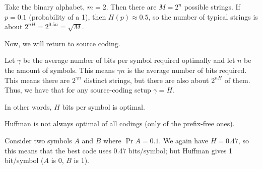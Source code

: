 \begin{example}
    Take the binary alphabet, $m = 2$. Then there are $M = 2^n$ possible strings. If $p = 0.1$ (probability of a 1), then $H(p) \approx 0.5$,
    so the number of typical strings is about $2^{nH} = 2^{0.5n} = \sqrt{M}$.
\end{example}

Now, we will return to source coding.

\begin{theorem}
    Let $\gamma$ be the average number of bits per symbol required optimally and let $n$ be the amount of symbols. This means $\gamma n$ is the average number of bits required.
    This means there are $2^{\gamma n}$ distinct strings, but there are also about $2^{nH}$ of them. Thus, we have that for any source-coding setup $\gamma = H$.
    
    In other words, $H$ bits per symbol is optimal.
\end{theorem}

Huffman is not always optimal of all codings (only of the prefix-free ones).
\begin{example}
    Consider two symbols $A$ and $B$ where $\Pr{A} = 0.1$. We again have $H = 0.47$, so this means that the best code uses
    0.47 bits/symbol; but Huffman gives 1 bit/symbol ($A$ is 0, $B$ is 1).
\end{example}